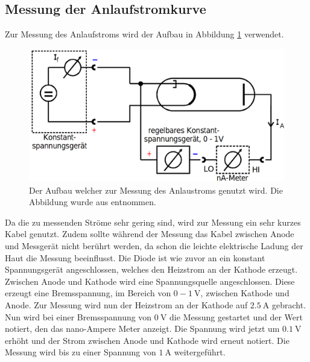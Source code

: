 \subsection{Messung der Anlaufstromkurve}
Zur Messung des Anlaufstroms wird der Aufbau in Abbildung \ref{fig:aufbau} verwendet.
\begin{figure}
    \centering
    \includegraphics[width=\textwidth]{content/data/aufbau.png}
    \caption{Der Aufbau welcher zur Messung des Anlaustroms genutzt wird. Die Abbildung wurde aus \cite[10]{anleitung} entnommen.}
    \label{fig:aufbau}
\end{figure}
Da die zu messenden Ströme sehr gering sind, wird zur Messung ein sehr kurzes Kabel genutzt.
Zudem sollte während der Messung das Kabel zwischen Anode und Messgerät nicht berührt werden, da schon die leichte elektrische Ladung der Haut die Messung beeinflusst.
Die Diode ist wie zuvor an ein konstant Spannungsgerät angeschlossen, welches den Heizstrom an der Kathode erzeugt.
Zwischen Anode und Kathode wird eine Spannungsquelle angeschlossen.
Diese erzeugt eine Bremsspannung, im Bereich von $0 - 1 \SI{}{\V}$, zwischen Kathode und Anode.
Zur Messung wird nun der Heizstrom an der Kathode auf $\SI{2.5}{\A}$ gebracht.
Nun wird bei einer Bremsspannung von $\SI{0}{\V}$ die Messung gestartet und der Wert notiert, den das nano-Ampere Meter anzeigt.
Die Spannung wird jetzt um $\SI{0.1}{\V}$ erhöht und der Strom zwischen Anode und Kathode wird erneut notiert.
Die Messung wird bis zu einer Spannung von $\SI{1}{\A}$ weitergeführt.